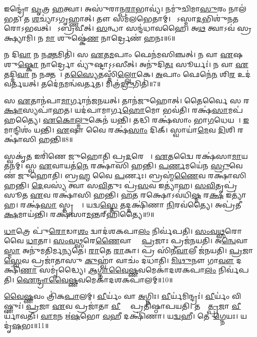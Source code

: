 𑌇𑌨𑍍𑌦𑍍𑌰𑍋॑ \ul{𑌵𑍃}𑌤𑍍𑌰 \ul{𑌹}𑌤𑍍𑌵𑌾।
𑌅𑌸𑍁॑𑌰𑌾𑌨𑍍𑌪\ul{𑌰𑌾}𑌭𑌾𑌵𑍍𑌯॑।
𑌨𑌮𑍁॑𑌚𑌿𑌮𑌾\ul{𑌸𑍁}𑌰𑌂 𑌨𑌾𑌲॑𑌭𑌤।
𑌤 \ul{𑌶}𑌚𑍍𑌯𑌾॑\-𑌽𑌗𑍃𑌹𑍍𑌣𑌾𑌤𑍍।
𑌤𑍗 𑌸𑌮॑𑌲𑌭𑍇𑌤𑌾𑌮𑍍।
𑌸𑍋᳚𑌽𑌸𑍍𑌮𑌾\ul{𑌦}𑌭𑌿𑌶𑍁॑𑌨𑌤𑌰𑍋\-𑌽𑌭𑌵𑌤𑍍।
𑌸𑍋᳚𑌽𑌬𑍍𑌰𑌵𑍀𑌤𑍍।
\ul{𑌸}𑌨𑍍𑌧𑌾 𑌸𑌨𑍍𑌦॑𑌧𑌾𑌵𑌹𑍈।
𑌅\ul{𑌥} 𑌤𑍍𑌵𑌾𑌽𑌵॑ 𑌸𑍍𑌰𑌕𑍍𑌷𑍍𑌯𑌾𑌮𑌿।
𑌨 \ul{𑌮𑌾} 𑌶𑍁𑌷𑍍𑌕𑍇॑\ul{𑌣} 𑌨𑌾𑌰𑍍𑌦𑍍𑌰𑍇𑌣॑ 𑌹𑌨𑌃॥6॥

𑌨 𑌦𑌿\ul{𑌵𑌾} 𑌨 𑌨\ul{𑌕𑍍𑌤}𑌮𑌿𑌤𑌿॑।
𑌸 \ul{𑌏}𑌤\ul{𑌮}𑌪𑌾𑌂 𑌫𑍇𑌨॑𑌮𑌸𑌿𑌞𑍍𑌚𑌤𑍍।
𑌨 𑌵𑌾 \ul{𑌏}𑌷 𑌶𑍁\ul{𑌷𑍍𑌕𑍋} 𑌨𑌾𑌰𑍍𑌦𑍍𑌰𑍋 𑌵𑍍𑌯𑍁॑𑌷𑍍𑌟𑌾\-𑌽𑌽𑌸𑍀𑌤𑍍।
𑌅𑌨𑍁॑𑌦𑌿\ul{𑌤𑌃} 𑌸𑍂𑌰𑍍𑌯𑌃॑।
𑌨 𑌵𑌾 \ul{𑌏}𑌤𑌦𑍍𑌦𑌿\ul{𑌵𑌾} 𑌨 𑌨𑌕𑍍𑌤𑌮𑍍᳚।
𑌤\ul{𑌸𑍍𑌯𑍈}𑌤𑌸𑍍𑌮𑌿𑌁॑\ul{𑌲𑍍𑌲𑍋}𑌕𑍇।
\ul{𑌅}𑌪𑌾𑌂 𑌫𑍇𑌨𑍇॑\ul{𑌨} 𑌶𑌿\ul{𑌰} 𑌉𑌦॑𑌵𑌰𑍍𑌤𑌯𑌤𑍍।
𑌤𑌦𑍇॑\ul{𑌨}𑌮𑌨𑍍𑌵॑𑌵𑌰𑍍𑌤𑌤।
𑌮𑌿𑌤𑍍𑌰॑\ul{𑌦𑍍𑌰𑍁}𑌗𑌿𑌤𑌿॑॥7॥

𑌸 \ul{𑌏}𑌤𑌾𑌨॑𑌪𑌾\ul{𑌮𑌾}𑌰𑍍𑌗𑌾𑌨॑𑌜𑌨𑌯𑌤𑍍।
𑌤𑌾𑌨॑𑌜𑍁𑌹𑍋𑌤𑍍।
𑌤𑍈𑌰𑍍𑌵𑍈 𑌸 𑌰\ul{𑌕𑍍𑌷𑌾}\ul{}𑌸𑍍𑌯𑌪𑌾॑𑌹𑌤।
𑌯𑌦॑𑌪𑌾𑌮𑌾𑌰𑍍𑌗\ul{𑌹𑍋}𑌮𑍋 𑌭𑌵॑𑌤𑌿।
𑌰𑌕𑍍𑌷॑\ul{𑌸𑌾}𑌮𑌪॑𑌹𑌤𑍍𑌯𑍈।
\ul{𑌏}\ul{𑌕𑍋}\ul{𑌲𑍍𑌮𑍁}𑌕𑍇𑌨॑ 𑌯𑌨𑍍𑌤𑌿।
𑌤𑌦𑍍𑌧𑌿 𑌰𑌕𑍍𑌷॑𑌸𑌾𑌂 𑌭𑌾\ul{𑌗}𑌧𑍇𑌯𑌮𑍍᳚।
\ul{𑌇}𑌮𑌾𑌨𑍍𑌦𑌿𑌶𑌂॑ 𑌯𑌨𑍍𑌤𑌿।
\ul{𑌏}𑌷𑌾 𑌵𑍈 𑌰𑌕𑍍𑌷॑\ul{𑌸𑌾𑌂} 𑌦𑌿𑌕𑍍।
𑌸𑍍𑌵𑌾𑌯𑌾॑\ul{𑌮𑍇}𑌵 \ul{𑌦𑌿}𑌶𑌿 𑌰𑌕𑍍𑌷𑌾॑𑌸𑌿 𑌹𑌨𑍍𑌤𑌿॥8॥

𑌸𑍍𑌵𑌕𑍃॑\ul{𑌤} 𑌇𑌰𑌿॑𑌣𑍇 𑌜𑍁𑌹𑍋𑌤𑌿 𑌪𑍍𑌰\ul{𑌦}𑌰𑍇 𑌵𑌾᳚।
\ul{𑌏}𑌤𑌦𑍍𑌵𑍈 𑌰𑌕𑍍𑌷॑𑌸𑌾\ul{𑌮𑌾}𑌯𑌤𑌨॑𑌮𑍍।
𑌸𑍍𑌵 \ul{𑌏}𑌵𑌾𑌯𑌤॑\ul{𑌨𑍇} 𑌰𑌕𑍍𑌷𑌾॑𑌸𑌿 𑌹𑌨𑍍𑌤𑌿।
\ul{𑌪}\ul{𑌰𑍍𑌣}𑌮𑌯𑍇॑𑌨 \ul{𑌸𑍍𑌰𑍁}𑌵𑍇𑌣॑ 𑌜𑍁𑌹𑍋𑌤𑌿।
𑌬𑍍𑌰\ul{𑌹𑍍𑌮} 𑌵𑍈 \ul{𑌪}𑌰𑍍𑌣𑌃।
𑌬𑍍𑌰𑌹𑍍𑌮॑\ul{𑌣𑍈}𑌵 𑌰𑌕𑍍𑌷𑌾॑𑌸𑌿 𑌹𑌨𑍍𑌤𑌿।
\ul{𑌦𑍇}𑌵𑌸𑍍𑌯॑ 𑌤𑍍𑌵𑌾 𑌸\ul{𑌵𑌿}𑌤𑍁𑌃 𑌪𑍍𑌰॑\ul{𑌸}𑌵 𑌇𑌤𑍍𑌯𑌾॑𑌹।
\ul{𑌸}\ul{𑌵𑌿}𑌤𑍃𑌪𑍍𑌰॑𑌸𑍂𑌤 \ul{𑌏}𑌵 𑌰𑌕𑍍𑌷𑌾॑𑌸𑌿 𑌹𑌨𑍍𑌤𑌿।
\ul{𑌹}𑌤 𑌰𑌕𑍍𑌷𑍋\-𑌽𑌵॑𑌧𑌿\ul{𑌷𑍍𑌮} 𑌰\ul{𑌕𑍍𑌷} 𑌇𑌤𑍍𑌯𑌾॑𑌹।
𑌰𑌕𑍍𑌷॑\ul{𑌸𑌾}\ul{} 𑌸𑍍𑌤𑍃𑌤𑍍𑌯𑍈᳚।
𑌯𑌦𑍍𑌵\ul{𑌸𑍍𑌤𑍇} 𑌤𑌦𑍍𑌦𑌕𑍍𑌷𑌿॑𑌣𑌾 \ul{𑌨𑌿}𑌰𑌵॑𑌤𑍍𑌯𑍈।
𑌅𑌪𑍍𑌰॑𑌤𑍀\ul{𑌕𑍍𑌷}𑌮𑌾𑌯॑𑌨𑍍𑌤𑌿।
𑌰𑌕𑍍𑌷॑𑌸𑌾\ul{𑌮}𑌨𑍍𑌤𑌰𑍍‌\mbox{}𑌹𑌿॑𑌤𑍍𑌯𑍈॥9॥\anuvakamend[\ul{𑌯}\ul{𑌚𑍍𑌛}\ul{𑌤𑌿} 𑌵𑌰𑍁॑\ul{𑌣𑌂} 𑌤𑍃𑌤𑍀॑\ul{𑌯𑌂} 𑌵𑌿𑌜𑌿॑𑌤𑍍𑌯𑌾 𑌅𑌸𑍃𑌜\ul{𑌤} 𑌸𑌮𑍃॑𑌦𑍍𑌧𑍍𑌯𑍈 𑌹\ul{𑌨𑍋} 𑌮𑌿𑌤𑍍𑌰॑\ul{𑌦𑍍𑌰𑍁}𑌗𑌿𑌤𑌿॑ 𑌹\ul{𑌨𑍍𑌤𑌿} 𑌸𑍍𑌤𑍃\ul{𑌤𑍍𑌯𑍈} 𑌤𑍍𑌰𑍀𑌣𑌿॑ 𑌚]

\ul{𑌧𑌾}𑌤𑍍𑌰𑍇 𑌪𑍁॑\ul{𑌰𑍋}𑌡𑌾\ul{𑌶𑌂} 𑌦𑍍𑌵𑌾𑌦॑𑌶𑌕𑌪𑌾\ul{𑌲𑌂} 𑌨𑌿𑌰𑍍𑌵॑𑌪𑌤𑌿।
\ul{𑌸𑌂}\ul{𑌵}\ul{𑌥𑍍𑌸}𑌰𑍋 𑌵𑍈 \ul{𑌧𑌾}𑌤𑌾।
\ul{𑌸𑌂}\ul{𑌵}\ul{𑌥𑍍𑌸}𑌰𑍇\ul{𑌣𑍈}𑌵𑌾𑌸𑍍𑌮𑍈᳚ \ul{𑌪𑍍𑌰}𑌜𑌾𑌃 𑌪𑍍𑌰𑌜॑𑌨𑌯𑌤𑌿।
𑌅\ul{𑌨𑍍𑌵𑍇}𑌵𑌾\ul{𑌸𑍍𑌮𑌾} 𑌅𑌨𑍁॑𑌮𑌤𑌿𑌰𑍍𑌮𑌨𑍍𑌯𑌤𑍇।
\ul{𑌰𑌾}𑌤𑍇 \ul{𑌰𑌾}𑌕𑌾।
𑌪𑍍𑌰 𑌸𑌿॑𑌨𑍀\ul{𑌵𑌾}𑌲𑍀 𑌜॑𑌨𑌯𑌤𑌿।
\ul{𑌪𑍍𑌰}𑌜𑌾\ul{𑌸𑍍𑌵𑍇}𑌵 𑌪𑍍𑌰𑌜𑌾॑𑌤𑌾𑌸𑍁 \ul{𑌕𑍁}𑌹𑍍𑌵𑌾॑ 𑌵𑌾𑌚𑌂॑ 𑌦𑌧𑌾𑌤𑌿।
\ul{𑌮𑌿}\ul{𑌥𑍁}𑌨𑍗 𑌗𑌾\ul{𑌵𑍗} 𑌦𑌕𑍍𑌷𑌿॑\ul{𑌣𑌾} 𑌸𑌮𑍃॑𑌦𑍍𑌧𑍍𑌯𑍈।
\ul{𑌆}\ul{𑌗𑍍𑌨𑌾}\ul{𑌵𑍈}\ul{𑌷𑍍𑌣}𑌵𑌮𑍇𑌕𑌾॑𑌦𑌶𑌕𑌪𑌾\ul{𑌲𑌂} 𑌨𑌿𑌰𑍍𑌵॑𑌪𑌤𑌿।
\ul{𑌐}\ul{𑌨𑍍𑌦𑍍𑌰𑌾}\ul{𑌵𑍈}\ul{𑌷𑍍𑌣}𑌵𑌮𑍇𑌕𑌾॑𑌦𑌶𑌕𑌪𑌾𑌲𑌮𑍍॥10॥

\ul{𑌵𑍈}\ul{𑌷𑍍𑌣}𑌵𑌂 𑌤𑍍𑌰𑌿॑𑌕\ul{𑌪𑌾}𑌲𑌮𑍍।
\ul{𑌵𑍀}𑌰𑍍𑌯𑌂॑ 𑌵𑌾 \ul{𑌅}𑌗𑍍𑌨𑌿𑌃।
\ul{𑌵𑍀}𑌰𑍍𑌯॑𑌮𑌿𑌨𑍍𑌦𑍍𑌰𑌃॑।
\ul{𑌵𑍀}𑌰𑍍𑌯𑌂॑ 𑌵𑌿𑌷𑍍𑌣𑍁𑌃॑।
\ul{𑌪𑍍𑌰}𑌜𑌾 \ul{𑌏}𑌵 𑌪𑍍𑌰𑌜𑌾॑𑌤𑌾 \ul{𑌵𑍀}𑌰𑍍𑌯𑍇᳚ 𑌪𑍍𑌰𑌤𑌿॑\-𑌷𑍍𑌠𑌾𑌪𑌯𑌤𑌿।
𑌤𑌸𑍍𑌮𑌾᳚\ul{𑌤𑍍𑌪𑍍𑌰}𑌜𑌾 \ul{𑌵𑍀}𑌰𑍍𑌯𑌾॑𑌵𑌤𑍀𑌃।
\ul{𑌵𑌾}\ul{𑌮}𑌨 𑌋॑\ul{𑌷}𑌭𑍋 \ul{𑌵}𑌹𑍀 𑌦𑌕𑍍𑌷𑌿॑𑌣𑌾।
𑌯\ul{𑌦𑍍𑌵}𑌹𑍀।
𑌤𑍇𑌨𑌾᳚\ul{𑌗𑍍𑌨𑍇}𑌯𑌃।
𑌯𑌦𑍃॑\ul{𑌷}𑌭𑌃॥11॥

